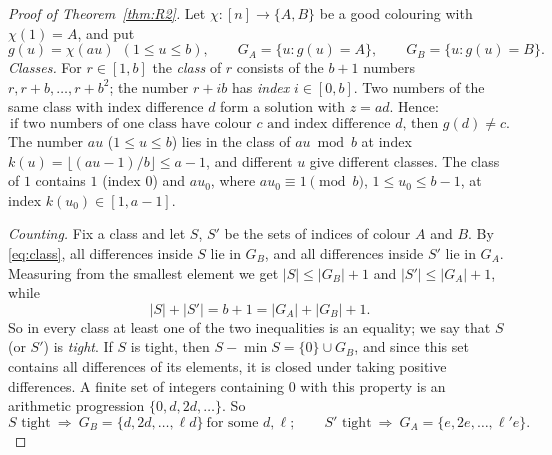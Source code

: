 \documentclass[11pt,a4paper]{article}
\theoremstyle{definition}
\theoremstyle{remark}
\begin{document}
\begin{proof}[Proof of Theorem~\ref{thm:R2}]
Let $\chi:[n]\to\{A,B\}$ be a good colouring with $\chi(1)=A$, and put
\[
  g(u)=\chi(au)\ \ (1\le u\le b),\qquad G_A=\{u:g(u)=A\},\qquad G_B=\{u:g(u)=B\}.
\]
\emph{Classes.} For $r\in[1,b]$ the \emph{class} of $r$ consists of the $b+1$ numbers $r,r+b,\dots,r+b^2$; the number $r+ib$ has \emph{index} $i\in[0,b]$. Two numbers of the same class with index difference $d$ form a solution with $z=ad$. Hence:
\begin{equation}\label{eq:class}
  \text{if two numbers of one class have colour $c$ and index difference $d$, then } g(d)\ne c .
\end{equation}
The number $au$ ($1\le u\le b$) lies in the class of $au\bmod b$ at index $k(u)=\lfloor(au-1)/b\rfloor\le a-1$, and different $u$ give different classes. The class of $1$ contains $1$ (index $0$) and $au_0$, where $au_0\equiv1\pmod b$, $1\le u_0\le b-1$, at index $k(u_0)\in[1,a-1]$.

\emph{Counting.} Fix a class and let $S$, $S'$ be the sets of indices of colour $A$ and $B$. By \eqref{eq:class}, all differences inside $S$ lie in $G_B$, and all differences inside $S'$ lie in $G_A$. Measuring from the smallest element we get $|S|\le|G_B|+1$ and $|S'|\le|G_A|+1$, while
\[
  |S|+|S'|=b+1=|G_A|+|G_B|+1 .
\]
So in every class at least one of the two inequalities is an equality; we say that $S$ (or $S'$) is \emph{tight}. If $S$ is tight, then $S-\min S=\{0\}\cup G_B$, and since this set contains all differences of its elements, it is closed under taking positive differences. A finite set of integers containing $0$ with this property is an arithmetic progression $\{0,d,2d,\dots\}$. So
\[
  \text{$S$ tight}\ \Longrightarrow\ G_B=\{d,2d,\dots,\ell d\}\ \text{for some $d,\ell$};\qquad
  \text{$S'$ tight}\ \Longrightarrow\ G_A=\{e,2e,\dots,\ell'e\}.
\]


\end{proof}
\end{document}
